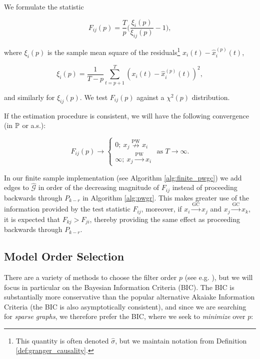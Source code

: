 \documentclass[12pt]{article}
\def\gc{\overset{\text{GC}}{\rightarrow}}  %
\def\pwgc{\overset{\text{PW}}{\rightarrow}}  %
\def\npwgc{\overset{\text{PW}}{\nrightarrow}}  %
\def\gcg{\mathcal{G}}  %
\begin{document}
We formulate the statistic 

\begin{equation}
  \label{eqn:gc_statistics}
  F_{ij}(p) = \frac{T}{p}\Big(\frac{\xi_i(p)}{\xi_{ij}(p)} - 1\Big),
\end{equation}

where $\xi_i(p)$ is the sample mean square of the
residuals\footnote{This quantity is often denoted $\widehat{\sigma}$,
  but we maintain notation from Definition
  \ref{def:granger_causality}.}  $x_i(t) - \widehat{x}^{(p)}_i(t)$,

\begin{equation*}
  \xi_i(p) = \frac{1}{T - p}\sum_{t = p + 1}^T (x_i(t) - \widehat{x}_i^{(p)}(t))^2,
\end{equation*}

and similarly for $\xi_{ij}(p)$.  We test $F_{ij}(p)$ against a
$\chi^2(p)$ distribution.

If the estimation procedure is consistent, we will have the following
convergence (in $\P$ or a.s.):

\begin{equation}
  F_{ij}(p) \rightarrow
  \left\{
    \begin{array}{ll}
      0;\ x_j \npwgc x_i\\
      \infty;\ x_j \pwgc x_i
    \end{array}
  \right. \text{ as } T \rightarrow \infty.  %
\end{equation}

In our finite sample implementation (see Algorithm
\ref{alg:finite_pwgc}) we add edges to $\widehat{\gcg}$ in order of
the decreasing magnitude of $F_{ij}$ instead of proceeding backwards
through $P_{k - r}$ in Algorithm \ref{alg:pwgr}.  This makes greater
use of the information provided by the test statistic $F_{ij}$,
moreover, if $x_i \gc x_j$ and $x_j \gc x_k$, it is expected that
$F_{kj} > F_{ji}$, thereby providing the same effect as proceeding
backwards through $P_{k - r}$.
\subsection{Model Order Selection}
\label{sec:model_order_selection}
There are a variety of methods to choose the filter order $p$ (see
e.g. \cite{lutkepohl2005new}), but we will focus in particular on the
Bayesian Information Criteria (BIC).  The BIC is substantially more
conservative than the popular alternative Akaiake Information Criteria
(the BIC is also asymptotically consistent), and since we are
searching for \textit{sparse graphs}, we therefore prefer the BIC,
where we seek to \textit{minimize} over $p$:
\end{document}
